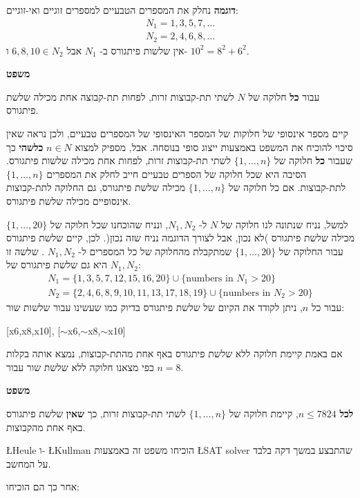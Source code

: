 \documentclass[12pt,a4paper]{article}
\begin{document}
\textbf{דוגמה}
נחלק את המספרים הטבעיים למספרים זוגיים ואי-זוגיים:
\begin{eqnarray*}
N_1 = 1,3,5,7,\ldots\\
N_2 = 2,4,6,8,\ldots
\end{eqnarray*}
אין שלשות פיתגורס ב-%
$N_1$
אבל
$6,8,10\in N_2$
ו-%
$10^2=8^2+6^2$.

\textbf{משפט}

עבור 
\textbf{כל}
חלוקה של 
$N$
לשתי תת-קבוצות זרות, לפחות תת-קבוצה אחת מכילה שלשת פיתגורס.

קיים מספר אינסופי של חלוקות של המספר האינסופי של המספרים טבעיים, ולכן נראה שאין סיכוי להוכיח את המשפט באמצעות ייצוג סופי בנוסחה. אבל, מספיק למצוא
$n\in N$ 
\textbf{כלשהי}
כך שעבור 
\textbf{כל}
חלוקה של 
$\{1,\ldots,n\}$
לשתי תת-קבוצות זרות, לפחות אחת מכילה שלשות פיתגורס. הסיבה היא שכל חלוקה של הספרים טבעיים חייב לחלק את המספרים
$\{1,\ldots,n\}$
לתת-קבוצות. אם כל חלוקה של
$\{1,\ldots,n\}$
מכילה שלשת פיתגורס, גם החלוקה לתת-קבוצות אינסופיים מכילה שלשת פיתגורס.

למשל, נניח שנתונה לנו חלוקה של
$N$
ל-%
$N_1,N_2$,
ונניח שהוכחנו שכל חלוקה של
$\{1,\ldots,20\}$
מכילה שלשת פיתגורס )לא נכון, אבל לצורך הדוגמה נניח שזה נכון(. לכן, קיים שלשת פיתגורס עבור החלוקה של
$\{1,\ldots,20\}$
שמתקבלת מהחלוקה של כל המספרים ל-
$N_1,N_2$
. שלשה זו היא גם שלשת פיתגורס של 
$N_1,N_2$:
\[
\begin{array}{l}
N_1 = \{1,3,5,7,12,15,16,20\} \cup \{\textrm{numbers in\ } N_1 > 20\}\\
N_2 = \{2,4,6,8,9,10,11,13,17,18,19\} \cup \{\textrm{numbers in\ } N_2 > 20\}
\end{array}
\]
עבור כל
$n$,
ניתן לקודד את הקיום של שלשת פיתגורס בדיוק כמו שעשינו עבור שלשות שור:
\begin{center}
\begin{ttfamily}
{[}x6,x8,x10], [$\sim$x6,$\sim$x8,$\sim$x10]
\end{ttfamily}
\end{center}
אם באמת קיימת חלוקה ללא שלשת פיתגורס באף אחת מהתת-קבוצות, נמצא אותה בקלות כפי מצאנו חלוקה ללא שלשת שור עבור 
$n=8$.

\textbf{משפט}

\textbf{לכל}
$n\leq 7824$,
קיימת חלוקה של
$\{1,\ldots,n\}$
לשתי תת-קבוצות זרות, כך 
\textbf{שאין}
שלשת פיתגורס באף אחת מהקבוצות.

\L{Heule}
ו-%
\L{Kullman}
הוכיחו משפט זה באמצעות
\L{SAT solver}
שהתבצע במשך דקה בלבד על המחשב.

אחר כך הם הוכיחו:
\end{document}

